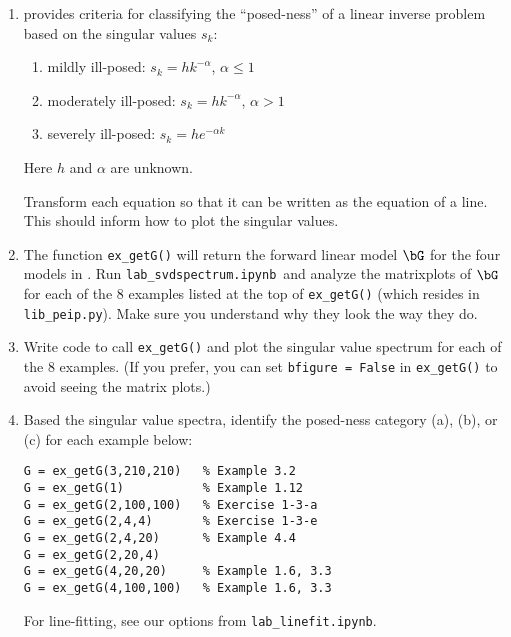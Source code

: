 \documentclass[11pt,titlepage,fleqn]{article}
\newcommand{\tfile}{{\tt lab\_svdspectrum.ipynb}}
\begin{document}
\begin{enumerate}

\item \citet[][Section~3.5, p.~74]{Aster} provides criteria for classifying the ``posed-ness'' of a linear inverse problem based on the singular values $s_k$:
%
\begin{enumerate}
\renewcommand{\theenumi}{\Alph{enumi}}
\item mildly ill-posed: $s_k = h k^{-\alpha}$, $\alpha \le 1$
\item moderately ill-posed: $s_k = h k^{-\alpha}$, $\alpha > 1$
\item severely ill-posed: $s_k = h e^{-\alpha k}$
\end{enumerate}
%
Here $h$ and $\alpha$ are unknown.

Transform each equation so that it can be written as the equation of a line. This should inform how to plot the singular values.

\item The function \verb+ex_getG()+ will return the forward linear model $\bG$ for the four models in \citet{Aster}. Run \tfile\ and analyze the matrixplots of $\bG$ for each of the 8 examples listed at the top of \verb+ex_getG()+ (which resides in \verb+lib_peip.py+). Make sure you understand why they look the way they do.

\item Write code to call \verb+ex_getG()+ and plot the singular value spectrum for each of the 8 examples. (If you prefer, you can set \verb+bfigure = False+ in \verb+ex_getG()+ to avoid seeing the matrix plots.)

\pagebreak
\item Based the singular value spectra, identify the posed-ness category (a), (b), or (c) for each example below:
%
\begin{spacing}{1.5}
\begin{verbatim}
G = ex_getG(3,210,210)   % Example 3.2
G = ex_getG(1)           % Example 1.12
G = ex_getG(2,100,100)   % Exercise 1-3-a
G = ex_getG(2,4,4)       % Exercise 1-3-e
G = ex_getG(2,4,20)      % Example 4.4
G = ex_getG(2,20,4)
G = ex_getG(4,20,20)     % Example 1.6, 3.3
G = ex_getG(4,100,100)   % Example 1.6, 3.3
\end{verbatim}
\end{spacing}
%
For line-fitting, see our options from \verb+lab_linefit.ipynb+.

\end{enumerate}


\end{document}
